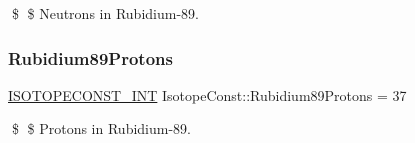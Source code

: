 \$ \$ Neutrons in Rubidium-\/89. \mbox{\label{group___isotope_const-_rubidium-_rb89_gac3db2f1571db822d4712837aa1ec4ea5}} 
\subsubsection{\texorpdfstring{Rubidium89\+Protons}{Rubidium89Protons}}
{\footnotesize\ttfamily \mbox{\hyperlink{group___isotope_const-_macros_ga5f18360b3e99483a35c32d789e62621c}{I\+S\+O\+T\+O\+P\+E\+C\+O\+N\+S\+T\+\_\+\+I\+NT}} Isotope\+Const\+::\+Rubidium89\+Protons = 37}

\$ \$ Protons in Rubidium-\/89. 